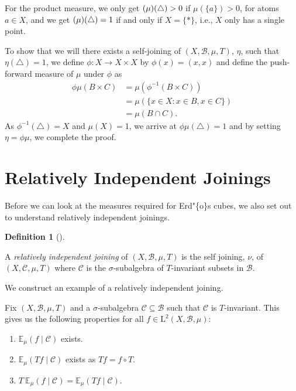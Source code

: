 \documentclass[
  british,
]{article}
\providecommand{\tightlist}{%
  \setlength{\itemsep}{0pt}\setlength{\parskip}{0pt}}
\theoremstyle{definition}
\newtheorem{definition}{Definition}[section]
\theoremstyle{plain}
\theoremstyle{remark}
\newcommand{\Measure}{{\mu}}
\newcommand{\SigmaAlgebra}[1]{{\mathscr{#1}}}
\newcommand{\Expectation}[1][\Measure]{{\mathbb{E}}_{#1}}
\begin{document}
For the product measure, we only get \((\ProductMeasure)(\triangle)>0\)
if \(\Measure(\{a\})>0\), for atoms \(a\in X\), and we get
\((\ProductMeasure)(\triangle)=1\) if and only if \(X=\{*\}\), i.e.,
\(X\) only has a single point.

To show that we will there exists a self-joining of
\((X,\SigmaAlgebra{B},\Measure,T)\), \(\eta\), such that
\(\eta(\triangle)=1\), we define \(\phi:X\rightarrow X\times X\) by
\(\phi(x)=(x,x)\) and define the push-forward measure of \(\Measure\)
under \(\phi\) as \begin{align*}
    \phi\Measure(B\times C) &=\Measure(\phi^{-1}(B\times C))
    \\&=\Measure(\{x\in X: x\in B,x\in C \})
    \\&=\Measure(B\cap C).
\end{align*} As \(\phi^{-1}(\triangle)=X\) and \(\Measure(X)=1\), we
arrive at \(\phi\Measure(\triangle)=1\) and by setting
\(\eta=\phi\Measure\), we complete the proof.

\section{Relatively Independent
Joinings}\label{relatively-independent-joinings}

Before we can look at the measures required for Erd"\{o\}s cubes, we
also set out to understand relatively independent joinings.

\begin{definition}[]\protect\hypertarget{def-RelativelyIndependentJoining}{}\label{def-RelativelyIndependentJoining}

A \emph{relatively independent joining} of
\((X,\SigmaAlgebra{B},\Measure,T)\) is the self joining, \(\nu\), of
\((X,\SigmaAlgebra{C},\Measure,T)\) where \(\SigmaAlgebra{C}\) is the
\(\sigma\)-subalgebra of \(T\)-invariant subsets in
\(\SigmaAlgebra{B}\).

\end{definition}

We construct an example of a relatively independent joining.

Fix \((X,\SigmaAlgebra{B},\Measure,T)\) and a \(\sigma\)-subalgebra
\(\SigmaAlgebra{C}\subseteq\SigmaAlgebra{B}\) such that
\(\SigmaAlgebra{C}\) is \(T\)-invariant. This gives us the following
properties for all \(f\in\text{L}^2(X,\SigmaAlgebra{B},\Measure)\):

\begin{enumerate}
\def\labelenumi{\arabic{enumi}.}
\tightlist
\item
  \(\Expectation(f\mid\SigmaAlgebra{C})\) exists.
\item
  \(\Expectation(Tf\mid\SigmaAlgebra{C})\) exists as \(Tf=f\circ T\).
\item
  \(T\ \Expectation(f\mid\SigmaAlgebra{C})=\Expectation(Tf\mid\SigmaAlgebra{C})\).
\end{enumerate}
\end{document}
